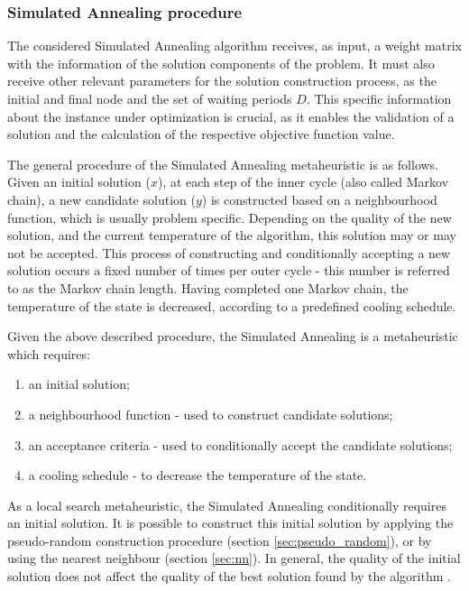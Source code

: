 \subsubsection{Simulated Annealing procedure}
\label{sec:sa}

The considered Simulated Annealing algorithm receives, as input, a weight matrix with the information of the solution components of the problem. It must also receive other relevant parameters for the solution construction process, as the initial and final node and the set of waiting periods $D$. This specific information about the instance under optimization is crucial, as it enables the validation of a solution and the calculation of the respective objective function value.

The general procedure of the Simulated Annealing metaheuristic is as follows. Given an initial solution ($x$), at each step of the inner cycle (also called Markov chain), a new candidate solution ($y$) is constructed based on a neighbourhood function, which is usually problem specific. Depending on the quality of the new solution, and the current temperature of the algorithm, this solution may or may not be accepted. This process of constructing and conditionally accepting a new solution occurs a fixed number of times per outer cycle - this number is referred to as the Markov chain length. Having completed one Markov chain, the temperature of the state is decreased, according to a predefined cooling schedule.

Given the above described procedure, the Simulated Annealing is a metaheuristic which requires:
\begin{enumerate}
    \item an initial solution;
    \item a neighbourhood function - used to construct candidate solutions; 
    \item an acceptance criteria - used to conditionally accept the candidate solutions;
    \item a cooling schedule - to decrease the temperature of the state.
\end{enumerate}


As a local search metaheuristic, the Simulated Annealing conditionally requires an initial solution.  It is possible to construct this initial solution by applying the pseudo-random construction procedure (section \ref{sec:pseudo_random}), or by using the nearest neighbour (section \ref{sec:nn}). In general, the quality of the initial solution does not affect the quality of the best solution found by the algorithm \cite{sa_initial_solution}.

